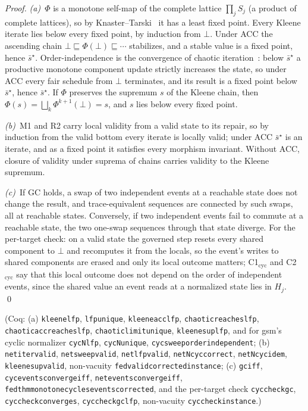 \documentclass[11pt,a4paper]{article}
\theoremstyle{plain}
\theoremstyle{definition}
\theoremstyle{remark}
\renewcommand{\_}{\textunderscore\allowbreak}
\begin{document}
\begin{proof}
\emph{(a)}~$\Phi$ is a monotone self-map of the complete lattice $\prod_j S_j$ (a
product of complete lattices), so by Knaster--Tarski~\cite{tarski1955} it has a
least fixed point.  Every Kleene iterate lies below every fixed point, by
induction from $\bot$.  Under ACC the ascending chain
$\bot \sqsubseteq \Phi(\bot) \sqsubseteq \cdots$ stabilizes, and a stable value
is a fixed point, hence $\bar{s}^{\star}$.  Order-independence is the
convergence of chaotic iteration~\cite{cousot1977}: below $\bar{s}^{\star}$ a
productive monotone component update strictly increases the state, so under ACC
every fair schedule from $\bot$ terminates, and its result is a fixed point
below $\bar{s}^{\star}$, hence $\bar{s}^{\star}$.  If $\Phi$ preserves the
supremum $s$ of the Kleene chain, then $\Phi(s) = \bigsqcup_k \Phi^{k+1}(\bot)
= s$, and $s$ lies below every fixed point.

\emph{(b)}~M1 and R2 carry local validity from a valid state to its repair, so
by induction from the valid bottom every iterate is locally valid; under ACC
$\bar{s}^{\star}$ is an iterate, and as a fixed point it satisfies every
morphism invariant.  Without ACC, closure of validity under suprema of chains
carries validity to the Kleene supremum.

\emph{(c)}~If GC holds, a swap of two independent events at a reachable state
does not change the result, and trace-equivalent sequences are connected by
such swaps, all at reachable states.  Conversely, if two independent events
fail to commute at a reachable state, the two one-swap sequences through that
state diverge.  For the per-target check: on a valid state the governed step
resets every shared component to $\bot$ and recomputes it from the locals, so
the event's writes to shared components are erased and only its local outcome
matters; C1$_{\mathrm{cyc}}$ and C2$_{\mathrm{cyc}}$ say that this local outcome
does not depend on the order of independent events, since the shared value an
event reads at a normalized state lies in $H_j$. \qed
\end{proof}

(Coq: (a) \texttt{kleene\_lfp}, \texttt{lfp\_unique},
\texttt{kleene\_acc\_lfp}, \texttt{chaotic\_reaches\_lfp},
\texttt{chaotic\_acc\_reaches\_lfp}, \texttt{chaotic\_limit\_unique},
\texttt{kleene\_sup\_lfp}, and for gsm's cyclic normalizer \texttt{cyc\_N\_lfp},
\texttt{cyc\_N\_unique}, \texttt{cyc\_sweep\_order\_independent}; (b)
\texttt{net\_iter\_valid}, \texttt{net\_sweep\_valid}, \texttt{net\_lfp\_valid},
\texttt{net\_Ncyc\_correct}, \texttt{net\_Ncyc\_idem}, \texttt{kleene\_sup\_valid},
non-vacuity \texttt{fed\_valid\_corrected\_instance}; (c) \texttt{gc\_iff},
\texttt{cyc\_events\_converge\_iff}, \texttt{net\_events\_converge\_iff},
\texttt{fed\_thm\_monotone\_cycles\_events\_corrected}, and the per-target check
\texttt{cyc\_check\_gc}, \texttt{cyc\_check\_converges},
\texttt{cyc\_check\_gc\_lfp}, non-vacuity \texttt{cyc\_check\_instance}.)
\end{document}
